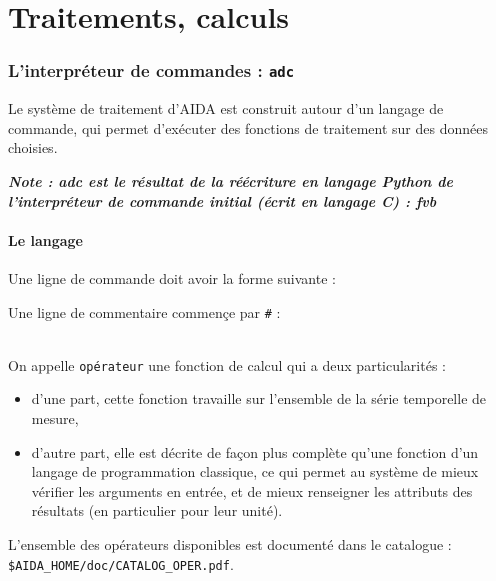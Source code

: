 \part{Traitements, calculs}
\label{part:traite}

\section{L'interpréteur de commandes : \texttt{adc}}

  Le système de traitement d'AIDA est construit autour d'un
langage de commande, qui permet d'exécuter des fonctions
de traitement sur des données choisies.

\medbreak
\textbf{\textit{Note : adc est le résultat de la réécriture en langage Python
de l'interpréteur de commande initial (écrit en langage C) : fvb}}

\subsection{Le langage}

Une ligne de commande doit avoir la forme suivante :


\medbreak
Une ligne de commentaire commençe par \texttt{\#} :

 \\

\bigbreak
On appelle \texttt{opérateur} une fonction de calcul qui a deux
particularités :
\begin{itemize}
  \item d'une part, cette fonction travaille sur l'ensemble de la série
        temporelle de mesure,
  \item d'autre part, elle est décrite de façon plus complète qu'une fonction
        d'un langage de programmation classique, ce qui permet au système de
        mieux vérifier les arguments en entrée, et de mieux renseigner les
        attributs des résultats (en particulier pour leur unité).
\end{itemize}

\medbreak
L'ensemble des opérateurs disponibles est documenté dans le catalogue : \\
\texttt{\$AIDA\_HOME/doc/CATALOG\_OPER.pdf}.

